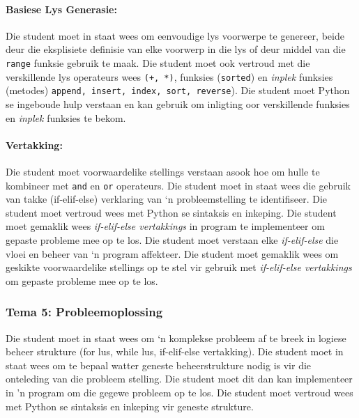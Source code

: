             \paragraph{Basiese Lys Generasie:}
                Die student moet in staat wees om eenvoudige lys voorwerpe te
                genereer, beide deur die eksplisiete definisie van elke
                voorwerp in die lys of deur middel van die \texttt{range}
                funksie gebruik te maak. Die student moet ook vertroud met die
                verskillende lys operateurs wees \texttt{(+, *)}, funksies
                (\texttt{sorted}) en \textit{inplek} funksies (metodes)
                \texttt{append, insert, index, sort, reverse}). Die student
                moet Python se ingeboude hulp verstaan en kan gebruik om
                inligting oor verskillende funksies en \textit{inplek} funksies
                te bekom.

            \paragraph{Vertakking:}
                Die student moet voorwaardelike stellings verstaan asook hoe om
                hulle te kombineer met \texttt {and} en \texttt{or} operateurs.
                Die student moet in staat wees die gebruik van takke
                (if-elif-else) verklaring van `n probleemstelling te
                identifiseer. Die student moet vertroud wees met Python se
                sintaksis en inkeping. Die student moet gemaklik wees
                \textit{if-elif-else vertakkings} in program te implementeer om
                gepaste probleme mee op te los.  Die student moet verstaan elke
                \textit{if-elif-else} die vloei en beheer van `n program
                affekteer.  Die student moet gemaklik wees om geskikte
                voorwaardelike stellings op te stel vir gebruik met
                \textit{if-elif-else vertakkings} om gepaste probleme mee op te
                los.

        \subsubsection{Tema 5: Probleemoplossing}
            Die student moet in staat wees om `n komplekse probleem af te breek
            in logiese beheer strukture (for lus, while lus, if-elif-else
            vertakking). Die student moet in staat wees om te bepaal watter
            geneste beheerstrukture nodig is vir die onteleding van die
            probleem stelling. Die student moet dit dan kan implementeer in 'n
            program om die gegewe probleem op te los. Die student moet vertroud
            wees met Python se sintaksis en inkeping vir geneste strukture.


